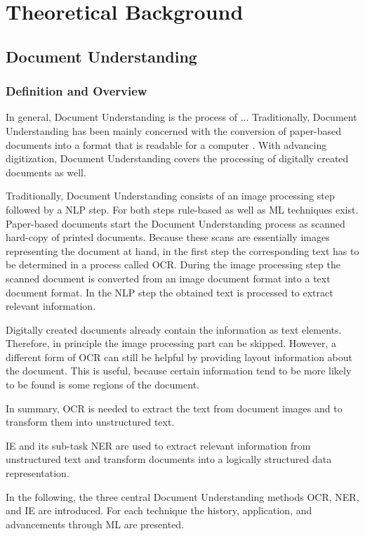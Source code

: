 \chapter{Theoretical Background}

\section{Document Understanding}
\subsection{Definition and Overview}
In general, Document Understanding is the process of ...
Traditionally, Document Understanding has been mainly concerned with the conversion of paper-based documents into a format that is readable for a computer \cite{taylor1994integrated}. 
With advancing digitization, Document Understanding covers the processing of digitally created documents as well. 

Traditionally, Document Understanding consists of an image processing step followed by a \ac{NLP} step. For both steps rule-based as well as \ac{ML} techniques exist. Paper-based documents start the Document Understanding process as scanned hard-copy of printed documents. Because these scans are essentially images representing the document at hand, in the first step the corresponding text has to be determined in a process called \ac{OCR}. During the image processing step the scanned document is converted from an image document format into a text document format. In the \ac{NLP} step the obtained text is processed to extract relevant information.

Digitally created documents already contain the information as text elements. Therefore, in principle the image processing part can be skipped. However, a different form of \ac{OCR} can still be helpful by providing layout information about the document. This is useful, because certain information tend to be more likely to be found is some regions of the document.

In summary, \ac{OCR} is needed to extract the text from document images and to transform them into unstructured text.

\ac{IE} and its sub-task \ac{NER} are used to extract relevant information from unstructured text and transform documents into a logically structured data representation.

In the following, the three central Document Understanding methods \ac{OCR}, \ac{NER}, and \ac{IE} are introduced. For each technique the history, application, and advancements through \ac{ML} are presented.

